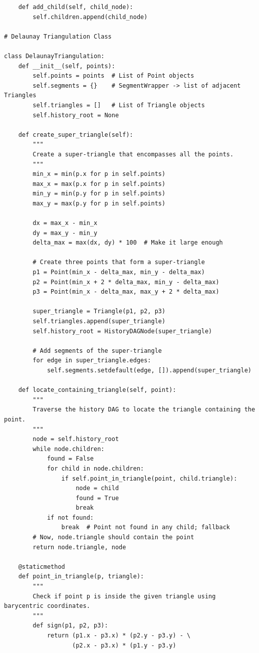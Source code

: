 \documentclass{article}
\begin{document}
\begin{verbatim}
    def add_child(self, child_node):
        self.children.append(child_node)

# Delaunay Triangulation Class

class DelaunayTriangulation:
    def __init__(self, points):
        self.points = points  # List of Point objects
        self.segments = {}    # SegmentWrapper -> list of adjacent Triangles
        self.triangles = []   # List of Triangle objects
        self.history_root = None

    def create_super_triangle(self):
        """
        Create a super-triangle that encompasses all the points.
        """
        min_x = min(p.x for p in self.points)
        max_x = max(p.x for p in self.points)
        min_y = min(p.y for p in self.points)
        max_y = max(p.y for p in self.points)

        dx = max_x - min_x
        dy = max_y - min_y
        delta_max = max(dx, dy) * 100  # Make it large enough

        # Create three points that form a super-triangle
        p1 = Point(min_x - delta_max, min_y - delta_max)
        p2 = Point(min_x + 2 * delta_max, min_y - delta_max)
        p3 = Point(min_x - delta_max, max_y + 2 * delta_max)

        super_triangle = Triangle(p1, p2, p3)
        self.triangles.append(super_triangle)
        self.history_root = HistoryDAGNode(super_triangle)

        # Add segments of the super-triangle
        for edge in super_triangle.edges:
            self.segments.setdefault(edge, []).append(super_triangle)

    def locate_containing_triangle(self, point):
        """
        Traverse the history DAG to locate the triangle containing the point.
        """
        node = self.history_root
        while node.children:
            found = False
            for child in node.children:
                if self.point_in_triangle(point, child.triangle):
                    node = child
                    found = True
                    break
            if not found:
                break  # Point not found in any child; fallback
        # Now, node.triangle should contain the point
        return node.triangle, node

    @staticmethod
    def point_in_triangle(p, triangle):
        """
        Check if point p is inside the given triangle using barycentric coordinates.
        """
        def sign(p1, p2, p3):
            return (p1.x - p3.x) * (p2.y - p3.y) - \
                   (p2.x - p3.x) * (p1.y - p3.y)


\end{verbatim}
\end{document}
